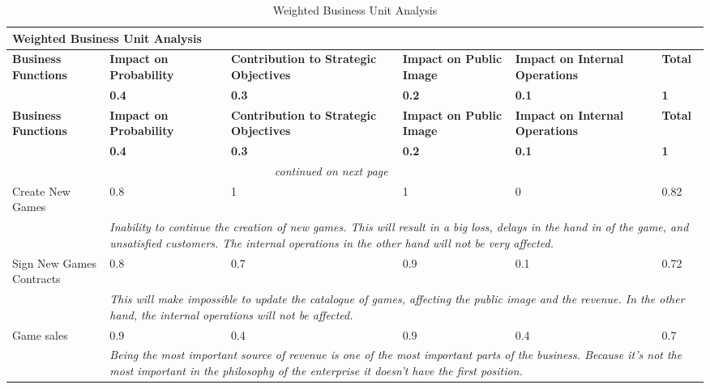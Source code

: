 \begin{longtable}{| p{2.7cm} | p{1.8cm} | p{1.8cm} | p{1.8cm} | p{1.8cm} | p{.8cm} |}
		\caption{Weighted Business Unit Analysis}\label{tab:BUA}\\
		\hline \multicolumn{6}{|p{12.4cm}|}{\textbf{Weighted Business Unit Analysis}}\\\hline
		\textbf{Business Functions} & \textbf{Impact on Probability} & \textbf{Contribution to Strategic Objectives} & \textbf{Impact on Public Image} & 	\textbf{Impact on Internal Operations} & \textbf{Total}\\
		  & \textbf{0.4} & \textbf{0.3} & \textbf{0.2} & \textbf{0.1} & \textbf{1}\\\hline
		\endfirsthead
		\textbf{Business Functions} & \textbf{Impact on Probability} & \textbf{Contribution to Strategic Objectives} & \textbf{Impact on Public Image} & 	\textbf{Impact on Internal Operations} & \textbf{Total}\\
		 & \textbf{0.4} & \textbf{0.3} & \textbf{0.2} & \textbf{0.1} & \textbf{1}\\\hline
		\endhead
		\multicolumn{5}{|c|}{\textit{continued on next page}}\\
		\endfoot
		\endlastfoot
		Create New Games & 0.8 & 1 & 1 & 0 & 0.82\\\hline
		& \multicolumn{5}{|p{9cm}|}{\textit{Inability to continue the creation of new games. This will result in a big loss, delays in the hand in of the game, and unsatisfied customers. The internal operations in the other hand will not be very affected.}}\\\hline
		Sign New Games Contracts & 0.8 & 0.7 & 0.9 & 0.1 & 0.72\\\hline
		& \multicolumn{5}{|p{9cm}|}{\textit{This will make impossible to update the catalogue of games, affecting the public image and the revenue. In the other hand, the internal operations will not be affected.}}\\\hline
		Game sales & 0.9 & 0.4 & 0.9 & 0.4 & 0.7\\\hline
		& \multicolumn{5}{|p{9cm}|}{\textit{Being the most important source of revenue is one of the most important parts of the business. Because it's not the most important in the philosophy of the enterprise it doesn't have the first position.}}\\\hline

\end{longtable}
